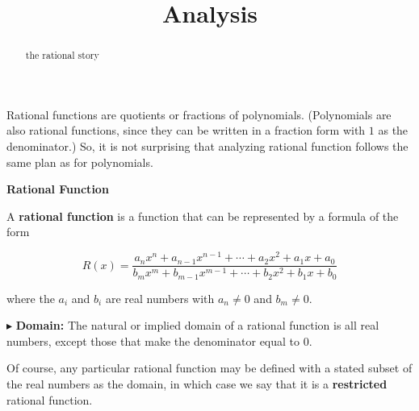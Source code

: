 \documentclass{ximera}
\title{Analysis}
\begin{document}
\begin{abstract}
the rational story
\end{abstract}
\maketitle









Rational functions are quotients or fractions of polynomials.  (Polynomials are also rational functions, since they can be written in a fraction form with $1$ as the denominator.)  So, it is not surprising that analyzing rational function follows the same plan as for polynomials.



















\begin{idea} \item \textbf{\textcolor{blue!55!black}{Rational Function}}  


A \textbf{rational function} is a function that can be represented by a formula of the form


\[   R(x) = \frac{a_n x^n + a_{n-1} x^{n-1} + \cdots + a_2 x^2 + a_1 x + a_0}{b_m x^m + b_{m-1} x^{m-1} + \cdots + b_2 x^2 + b_1 x + b_0}        \]

where the $a_i$ and $b_i$ are real numbers with $a_n \ne 0$ and $b_m \ne 0$.


\end{idea}



$\blacktriangleright$ \textbf{\textcolor{red!10!blue!90!}{Domain:}}  The natural or implied domain of a rational function is all real numbers, except those that make the denominator equal to $0$.  



Of course, any particular rational function may be defined with a stated subset of the real numbers as the domain, in which case we  say that it is a \textbf{restricted} rational function.
\end{document}
